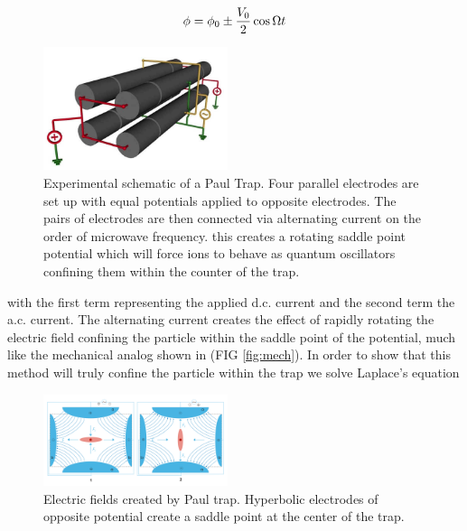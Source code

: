 \documentclass[aps,prb,twocolumn,superscriptaddress]{revtex4-1}
\begin{document}
\begin{equation}
\phi = \phi_0\pm\frac{V_0}{2}\cos{\Omega t}\\
\label{eq:pot}
\end{equation}
\begin{figure}
	\begin{center}
		\includegraphics[width=0.48\textwidth]{expSetup}
	\end{center}
	\vspace{-2mm}
	\caption{Experimental schematic of a Paul Trap. Four parallel electrodes are set up with equal potentials applied to opposite electrodes.  The pairs of electrodes are then connected via alternating current on the order of microwave frequency.  this creates a rotating saddle point potential which will force ions to behave as quantum oscillators confining them within the counter of the trap.}
	\label{fig:setup}
	\vspace{-3mm}
\end{figure}
with the first term representing the applied d.c. current and the second term the a.c. current. The alternating current creates the effect of rapidly rotating the electric field confining the particle within the saddle point of the potential, much like the mechanical analog shown in (FIG \ref{fig:mech}).
In order to show that this method will truly confine the particle within the trap we solve Laplace's equation
\begin{figure}
	\begin{center}
		\includegraphics[width=0.48\textwidth]{2000px-Paul-Trap.png}
	\end{center}
	\vspace{-2mm}
	\caption{Electric fields created by Paul trap. Hyperbolic electrodes of opposite potential create a saddle point at the center of the trap.}
	\label{fig:pot}
	\vspace{-3mm}
\end{figure}
\end{document}
